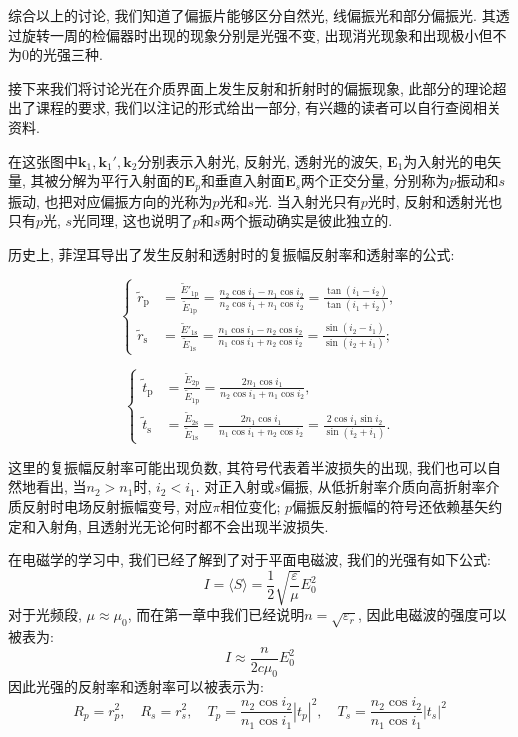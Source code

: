 综合以上的讨论, 我们知道了偏振片能够区分自然光, 线偏振光和部分偏振光. 其透过旋转一周的检偏器时出现的现象分别是光强不变, 出现消光现象和出现极小但不为$0$的光强三种.

接下来我们将讨论光在介质界面上发生反射和折射时的偏振现象, 此部分的理论超出了课程的要求, 我们以注记的形式给出一部分, 有兴趣的读者可以自行查阅相关资料.
\begin{noteenv}

    在这张图中$\bm{k}_1,\bm{k}_1',\bm{k}_2$分别表示入射光, 反射光, 透射光的波矢, $\bm{E}_1$为入射光的电矢量, 其被分解为平行入射面的$\bm{E}_p$和垂直入射面$\bm{E}_s$两个正交分量, 分别称为$p$振动和$s$振动, 也把对应偏振方向的光称为$p$光和$s$光. 当入射光只有$p$光时, 反射和透射光也只有$p$光, $s$光同理, 这也说明了$p$和$s$两个振动确实是彼此独立的.

    历史上, 菲涅耳导出了发生反射和透射时的复振幅反射率和透射率的公式:

\[
\left\{
\begin{aligned}
\tilde{r}_{\mathrm{p}} &= \frac{\tilde{E}'_{1\mathrm{p}}}{\tilde{E}_{1\mathrm{p}}} = \frac{n_2 \cos i_1 - n_1 \cos i_2}{n_2 \cos i_1 + n_1 \cos i_2}= \frac{\tan(i_1 - i_2)}{\tan(i_1 + i_2)}, \\[8pt]
\tilde{r}_{\mathrm{s}} &= \frac{\tilde{E}'_{1\mathrm{s}}}{\tilde{E}_{1\mathrm{s}}} = \frac{n_1 \cos i_1 - n_2 \cos i_2}{n_1 \cos i_1 + n_2 \cos i_2} = \frac{\sin(i_2 - i_1)}{\sin(i_2 + i_1)};
\end{aligned}
\right.
\]

\[
\left\{
\begin{aligned}
\tilde{t}_{\mathrm{p}} &= \frac{\tilde{E}_{2\mathrm{p}}}{\tilde{E}_{1\mathrm{p}}} = \frac{2n_1 \cos i_1}{n_2 \cos i_1 + n_1 \cos i_2}, \\[8pt]
\tilde{t}_{\mathrm{s}} &= \frac{\tilde{E}_{2\mathrm{s}}}{\tilde{E}_{1\mathrm{s}}} = \frac{2n_1 \cos i_1}{n_1 \cos i_1 + n_2 \cos i_2}= \frac{2 \cos i_1 \sin i_2}{\sin(i_2 + i_1)}.
\end{aligned}
\right.
\]

这里的复振幅反射率可能出现负数, 其符号代表着半波损失的出现, 我们也可以自然地看出, 当$n_2>n_1$时, $i_2<i_1$. 对正入射或$s$偏振, 从低折射率介质向高折射率介质反射时电场反射振幅变号, 对应$\pi$相位变化; $p$偏振反射振幅的符号还依赖基矢约定和入射角, 且透射光无论何时都不会出现半波损失.

在电磁学的学习中, 我们已经了解到了对于平面电磁波, 我们的光强有如下公式:
\[
I = \langle S \rangle = \frac{1}{2}\sqrt{\frac{\varepsilon}{\mu}}E_0^2
\]
对于光频段, $\mu\approx \mu_0$, 而在第一章中我们已经说明$n=\sqrt{\varepsilon_r}$, 因此电磁波的强度可以被表为:
\[
I \approx \frac{n}{2c\mu_0}E_0^2
\]
因此光强的反射率和透射率可以被表示为:
\[
R_p = r_p^2 , \quad R_s = r_s^2 , \quad T_p = \frac{n_2\cos i_2}{n_1\cos i_1}|t_p|^2, \quad T_s = \frac{n_2\cos i_2}{n_1\cos i_1}|t_s|^2
\]


\end{noteenv}

